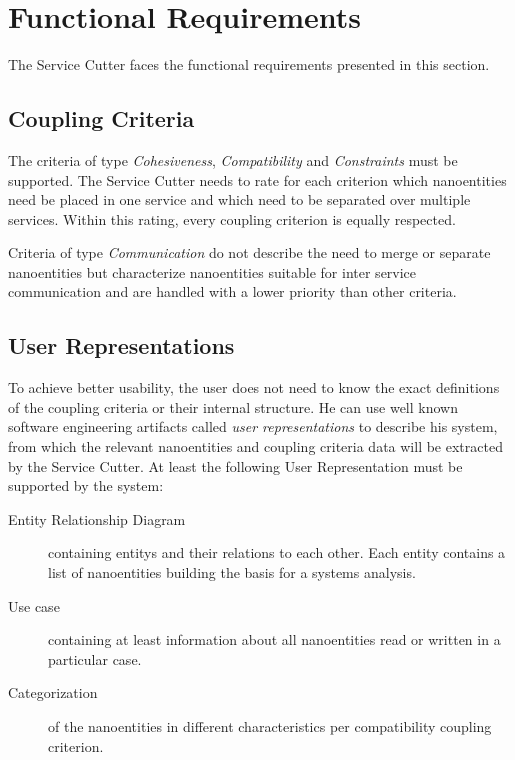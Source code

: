 \section{Functional Requirements}
\label{sec:functionalRequirements}

The Service Cutter faces the functional requirements presented in this
section.

\subsection{Coupling Criteria}

The criteria of type \textit{Cohesiveness}, \textit{Compatibility} and \textit{Constraints} must be supported. The Service Cutter needs to rate for each criterion which nanoentities need be placed in one service and which need to be separated over multiple services. Within this rating, every coupling criterion is equally respected.

Criteria of type \textit{Communication} do not describe the need to merge or separate nanoentities but characterize nanoentities suitable for inter service communication and are handled with a lower priority than other criteria. 

\subsection{User Representations}

To achieve better usability, the user does not need to know the exact definitions of the coupling criteria or their internal structure. He can use well known software engineering artifacts called \textit{user representations} to describe his system, from which the relevant nanoentities and coupling criteria data will be extracted by the Service Cutter. At least the following User Representation must be supported by the system:

\begin{description}
	\item[Entity Relationship Diagram] containing \glspl{entity} and their relations to each other. Each entity contains a list of nanoentities building the basis for a systems analysis.
	\item[Use case] containing at least information about all nanoentities read or written in a particular case. 
	\item[Categorization] of the nanoentities in different characteristics per compatibility coupling criterion. 
\end{description}

